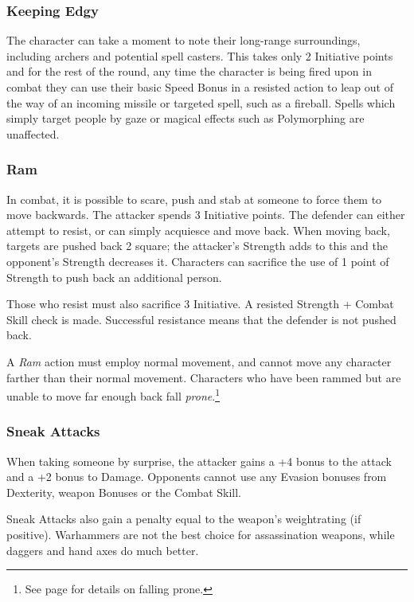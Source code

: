 \begin{multicols}{2}
\subsubsection{Keeping Edgy}\label{edgy}

The character can take a moment to note their long-range surroundings, including archers and potential spell casters.
This takes only 2 Initiative points and for the rest of the \gls{round}, any time the character is being fired upon in combat they can use their basic Speed Bonus in a resisted action to leap out of the way of an incoming missile or targeted spell, such as a fireball.
Spells which simply target people by gaze or magical effects such as Polymorphing are unaffected.

\subsubsection{Ram}
\label{ram}

In combat, it is possible to scare, push and stab at someone to force them to move backwards. The attacker spends 3 Initiative points. The defender can either attempt to resist, or can simply acquiesce and move back. When moving back, targets are pushed back 2 square; the attacker's Strength adds to this and the opponent's Strength decreases it. Characters can sacrifice the use of 1 point of Strength to push back an additional person.

Those who resist must also sacrifice 3 Initiative. A resisted Strength + Combat Skill check is made. Successful resistance means that the defender is not pushed back.

A \textit{Ram} action must employ normal movement, and cannot move any character farther than their normal movement.  Characters who have been rammed but are unable to move far enough back fall \textit{prone}.\footnote{See page \pageref{prone} for details on falling prone.}

\subsubsection{Sneak Attacks}\label{sneakattack}

When taking someone by surprise, the attacker gains a +4 bonus to the attack and a +2 bonus to Damage. Opponents cannot use any Evasion bonuses from Dexterity, weapon Bonuses or the Combat Skill.

Sneak Attacks also gain a penalty equal to the weapon's \gls{weightrating} (if positive).
Warhammers are not the best choice for assassination weapons, while daggers and hand axes do much better.


\end{multicols}
